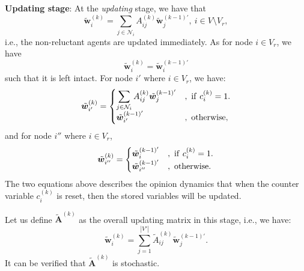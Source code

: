 \documentclass[letter]{article}
\theoremstyle{remark}
\begin{document}
\textbf{Updating stage}: At the \emph{updating} stage, we have that 
\[
\tilde{\bm w}_i^{(k)} = \sum_{j \in \mathcal{N}_i} A_{ij}^{(k)} \tilde{\bm w}_j^{(k-1)'},~i \in V \setminus V_r,
\]
i.e., the non-reluctant agents are updated immediately. 
As for node $i \in V_r$, we have $$\tilde{\bm w}_i^{(k)} = \tilde{\bm w}_i^{(k-1)'}$$ such that it is left intact. 
For node $i'$ where $i \in V_r$, we have:
\[
\tilde{\bm w}_{i'}^{(k)} = \begin{cases}
\displaystyle \sum_{j \in \mathcal{N}_i} A_{ij}^{(k)} \tilde{\bm w}_j^{(k-1)'}&,~{\rm if}~c_i^{(k)} = 1. \\
\tilde{\bm w}_{i'}^{(k-1)'}&,~{\rm otherwise},
\end{cases}
\]
and for node $i''$ where $i \in V_r$, 
\[
\tilde{\bm w}_{i''}^{(k)} = \begin{cases}
\tilde{\bm w}_{i}^{(k-1)'}&,~{\rm if}~c_i^{(k)} = 1. \\
\tilde{\bm w}_{i''}^{(k-1)'}&,~{\rm otherwise}.
\end{cases}
\]
The two equations above describes the opinion dynamics that when the counter variable $c_i^{(k)}$ is reset, then the stored variables will be updated. 

Let us define $\tilde{\bm A}^{(k)}$ as the overall updating matrix in this stage, i.e., we have:
\[
\tilde{\bm w}_i^{(k)} = \sum_{j=1}^{|V'|} \tilde{A}_{ij}^{(k)} \tilde{\bm w}_j^{(k-1)'}.
\]
It can be verified that $\tilde{\bm A}^{(k)}$ is stochastic. 

\end{document}
